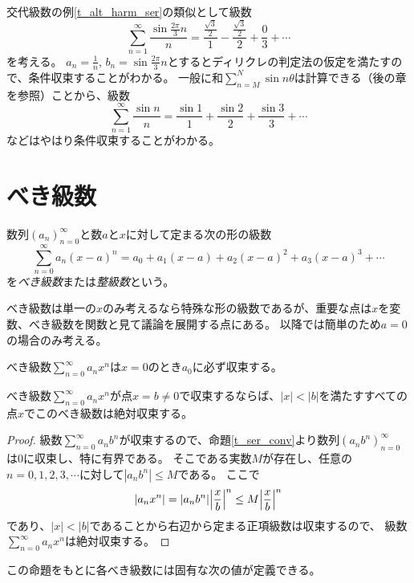 \begin{example}
交代級数の例\ref{t_alt_harm_ser}の類似として級数
$$
\sum_{n = 1}^\infty \frac{\sin\frac{2\pi}{3}n}{n} = \frac{\frac{\sqrt{3}}{2}}{1}-\frac{\frac{\sqrt{3}}{2}}{2}+\frac{0}{3}+\cdots
$$
を考える。
$a_n = \frac{1}{n}$, $b_n = \sin\frac{2\pi}{3}n$とするとディリクレの判定法の仮定を満たすので、条件収束することがわかる。
一般に和$\sum_{n = M}^N \sin n\theta$は計算できる（後の章を参照）ことから、級数
$$
\sum_{n = 1}^\infty \frac{\sin n}{n} = \frac{\sin 1}{1}+\frac{\sin 2}{2}+\frac{\sin 3}{3}+\cdots
$$
などはやはり条件収束することがわかる。
\end{example}

\section{べき級数}

\begin{definition}[べき級数]
数列$(a_n)_{n = 0}^\infty$と数$a$と$x$に対して定まる次の形の級数
$$
\sum_{n = 0}^\infty a_n(x-a)^n = a_0+a_1(x-a)+a_2(x-a)^2+a_3(x-a)^3+\cdots
$$
を\emph{べき級数}または\emph{整級数}という。
\end{definition}

べき級数は単一の$x$のみ考えるなら特殊な形の級数であるが、重要な点は$x$を変数、べき級数を関数と見て議論を展開する点にある。
以降では簡単のため$a = 0$の場合のみ考える。

\begin{remark}
べき級数$\sum_{n = 0}^\infty a_n x^n$は$x = 0$のとき$a_0$に必ず収束する。
\end{remark}

\begin{proposition}[べき級数の収束性]
べき級数$\sum_{n = 0}^\infty a_n x^n$が点$x = b \ne 0$で収束するならば、$|x| < |b|$を満たすすべての点$x$でこのべき級数は絶対収束する。
\end{proposition}

\begin{proof}
級数$\sum_{n = 0}^\infty a_n b^n$が収束するので、命題\ref{t_ser_conv}より数列$(a_n b^n)_{n = 0}^\infty$は$0$に収束し、特に有界である。
そこである実数$M$が存在し、任意の$n = 0, 1, 2, 3, \cdots$に対して$|a_n b^n| \le M$である。
ここで
$$
|a_n x^n| = |a_n b^n|\abs{\frac{x}{b}}^n \le M\abs{\frac{x}{b}}^n
$$
であり、$|x| < |b|$であることから右辺から定まる正項級数は収束するので、
級数$\sum_{n = 0}^\infty a_n x^n$は絶対収束する。
\end{proof}

この命題をもとに各べき級数には固有な次の値が定義できる。

